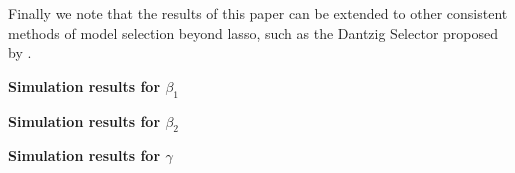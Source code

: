\documentclass[11pt]{article}
\begin{document}
Finally we note that the results of this paper can be extended to other consistent methods of model selection beyond lasso, such as the Dantzig Selector proposed by \cite{candes/tao:07}.
\newpage


\begin{table}[H]
\begin{center}
{\footnotesize
\caption{\textbf{Simulation results for $\beta_1$}}
\label{tab:x1}

}
\end{center}
\end{table}

\begin{table}[H]
\begin{center}
{\footnotesize
\caption{\textbf{Simulation results for $\beta_2$}}
\label{tab:x2}

}
\end{center}
\end{table}

\begin{table}[H]
\begin{center}
{\footnotesize
\caption{\textbf{Simulation results for $\gamma$}}
\label{tab:gamma}

}
\end{center}
\end{table}

\newpage


\newpage

\end{document}
